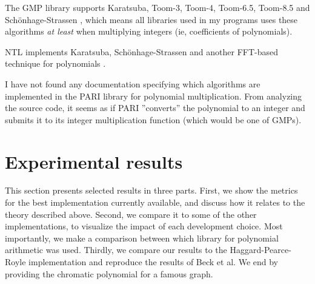 \documentclass[a4paper]{article}
\begin{document}


The GMP library supports Karatsuba, Toom-3, Toom-4, Toom-6.5, Toom-8.5 and Schönhage-Strassen \cite[p 90]{gmp}, which means all libraries used in my programs uses these algorithms \emph{at least} when multiplying integers (ie, coefficients of polynomials).

NTL implements Karatsuba, Schönhage-Strassen and another FFT-based technique for polynomials \cite{ntl_zzx}.

I have not found any documentation specifying which algorithms are implemented in the PARI library for polynomial multiplication. From analyzing the source code, it seems as if PARI ''converts'' the polynomial to an integer and submits it to its integer multiplication function (which would be one of GMPs).

\section{Experimental results}
This section presents selected results in three parts. First, we show the metrics for the best implementation currently available, and discuss how it relates to the theory described above. Second, we compare it to some of the other implementations, to visualize the impact of each development choice. Most importantly, we make a comparison between which library for polynomial arithmetic was used. Thirdly, we compare our results to the Haggard-Pearce-Royle implementation \cite{haggard} and reproduce the results of Beck et al\cite{signed_petersen}. We end by providing the chromatic polynomial for a famous graph.
\end{document}
